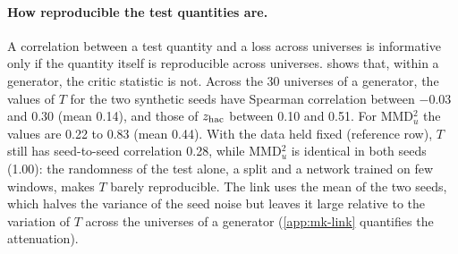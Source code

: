 \paragraph{How reproducible the test quantities are.}
A correlation between a test quantity and a loss across universes is informative only if the
quantity itself is reproducible across universes.  shows that,
within a generator, the critic statistic is not. Across the 30 universes of a generator, the
values of $T$ for the two synthetic seeds have Spearman correlation between $-0.03$ and 0.30 (mean
0.14), and those of $z_{\mathrm{hac}}$ between 0.10 and 0.51. For MMD$^2_u$ the values are 0.22 to 0.83 (mean
0.44). With the data held fixed (reference row), $T$ still has seed-to-seed correlation 0.28,
while MMD$^2_u$ is identical in both seeds (1.00): the randomness of the test alone, a split and a
network trained on few windows, makes $T$ barely reproducible. The link uses the mean of the two
seeds, which halves the variance of the seed noise but leaves it large relative to the variation
of $T$ across the universes of a generator (\cref{app:mk-link} quantifies the attenuation).

\begin{table}[tbp]
  \centering
  \caption{Spearman correlations between test quantities and utility losses (E4; sample
  moments). Panel A: replica-wise portfolios (the DESIGN measure); panel B: portfolios from the
  moments of the pooled replicas (misspecification only). Test quantities are seed means (two
  seeds); $\abs{\Delta\,\text{avg.\ corr.}}$: absolute difference between the synthetic and the
  real \TRAIN{} mean pairwise correlation (not a test). Pooled: over the 150 (universe,
  generator) points, universe-bootstrap 95\% percentile interval (2000 draws). Within-universe and
  within-generator: mean Spearman correlation across the 5 generators of a universe or the 30
  universes of a generator, two-sided permutation p-values (2000 permutations). Generator level:
  Spearman correlation of the 5 generator means, exact two-sided p-value over the 120 orderings.
  Universes share dates, so intervals are optimistic. All losses:
  \cref{tab:e4-link-full,tab:e4-link-pooled}.}
  \label{tab:e4-link}
  \small
\end{table}

